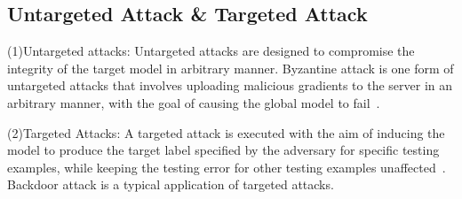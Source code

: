 \subsection{Untargeted Attack \& Targeted Attack}
(1)Untargeted attacks: Untargeted attacks are designed
to compromise the integrity of the target model in 
arbitrary manner. Byzantine attack is one form of untargeted
attacks that involves uploading malicious gradients to the
server in an arbitrary manner, with the goal of causing
the global model to fail~\cite{lamport2019byzantine,xie2020fall,bernstein2018signsgd,damaskinos2019aggregathor}.  

(2)Targeted Attacks: A targeted attack is executed with
the aim of inducing the model to produce the target label
specified by the adversary for specific testing examples,
while keeping the testing error for other testing examples
unaffected~\cite{damaskinos2019aggregathor}. Backdoor attack is a typical application
of targeted attacks.  